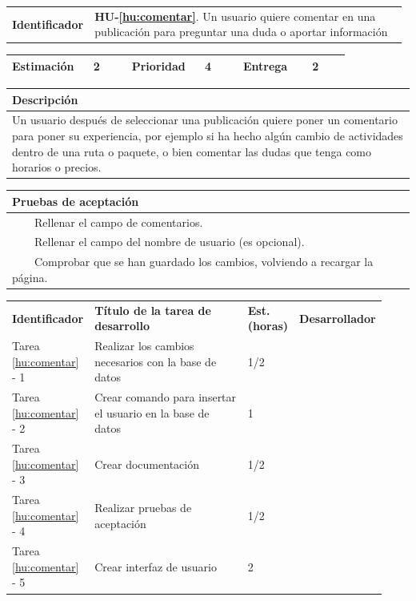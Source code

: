 \documentclass[11pt]{article}
\newcommand{\tabitem}{~~\llap{\textbullet}~~}
\begin{document}
\begin{longtable}{p{0.18\linewidth}|p{0.8\linewidth}}
  \rowcolor{LightCyan}
  \textbf{Identificador} & \textbf{HU-\ref{hu:comentar}}. Un usuario quiere comentar en una publicación para preguntar una duda o aportar información \\  
\end{longtable}
\vspace{-0.8cm}
\begin{longtable}{p{0.18\linewidth}|p{0.1\linewidth}|p{0.18\linewidth}|p{0.1\linewidth}|p{0.18\linewidth}|p{0.1\linewidth}}
  \toprule
  \textbf{Estimación} & 2 & \textbf{Prioridad} & 4 & \textbf{Entrega} & 2 \\
  \bottomrule
\end{longtable}
\vspace{-0.8cm}
\begin{longtable}{p{1.028\linewidth}}
  \textbf{Descripción}\\
  \midrule
  Un usuario después de seleccionar una publicación quiere poner un comentario para poner su experiencia, por ejemplo si ha hecho algún cambio de actividades dentro de una ruta o paquete, o bien comentar las dudas que tenga como horarios o precios. \\
  \bottomrule
\end{longtable}
\vspace{-0.8cm}
\begin{longtable}{p{1.028\linewidth}}
  \textbf{Pruebas de aceptación}\\
  \midrule
  \tabitem Rellenar el campo de comentarios.\\
  \tabitem Rellenar el campo del nombre de usuario (es opcional).\\
  \tabitem Comprobar que se han guardado los cambios, volviendo a recargar la página.\\
\end{longtable}
\vspace{-0.8cm}
\begin{longtable}{p{0.18\linewidth}|p{0.48\linewidth}|p{0.1\linewidth}|p{0.17\linewidth}}
  \toprule
  \textbf{Identificador} & \textbf{Título de la tarea de desarrollo} & \textbf{Est. (horas)} & \textbf{Desarrollador} \\
  Tarea \ref{hu:comentar} - 1 & Realizar los cambios necesarios con la base de datos & 1/2 &\\
  Tarea \ref{hu:comentar} - 2 & Crear comando para insertar el usuario en la base de datos & 1 & \\
  Tarea \ref{hu:comentar} - 3 & Crear documentación & 1/2 & \\
  Tarea \ref{hu:comentar} - 4 & Realizar pruebas de aceptación & 1/2 &  \\
  Tarea \ref{hu:comentar} - 5 & Crear interfaz de usuario & 2 &  \\
  \bottomrule
\end{longtable}
\end{document}
